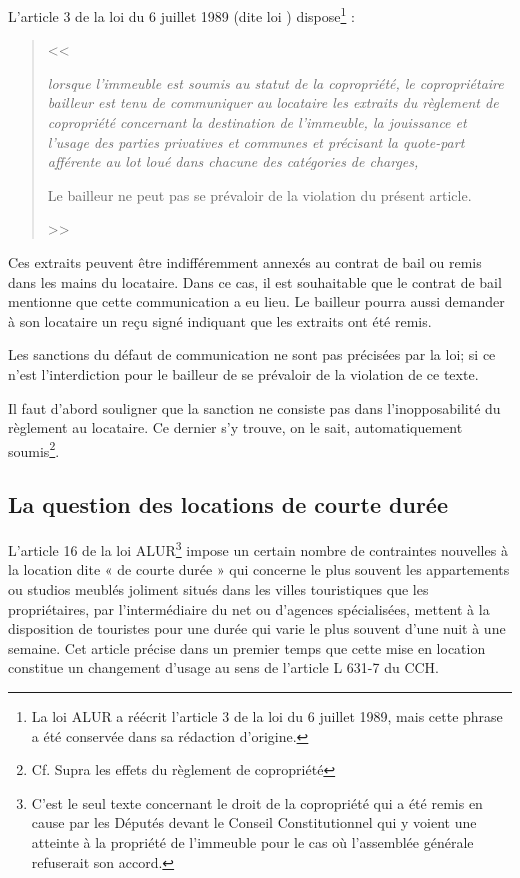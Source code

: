 		L'article 3 de la loi du 6 juillet 1989 (dite loi ) dispose\footnote{La loi ALUR a réécrit l’article 3 de la loi du 6 juillet 1989, mais cette phrase a été conservée dans sa rédaction d’origine.} :
		\begin{quote}
			<< {\itshape lorsque l'immeuble est soumis au statut de la copropriété, le copropriétaire bailleur est tenu de communiquer au locataire les extraits du règlement de copropriété concernant la destination de l'immeuble, la jouissance et l'usage des parties privatives et communes et précisant la quote-part afférente au lot loué dans chacune des catégories de charges,
			
			\lips
			
			Le bailleur ne peut pas se prévaloir de la violation du présent article. } >>
		\end{quote}
		Ces extraits peuvent être indifféremment annexés au contrat de bail ou remis dans les mains du locataire. Dans ce cas, il est souhaitable que le contrat de bail mentionne que cette communication a eu lieu. Le bailleur pourra aussi demander à son locataire un reçu signé indiquant que les extraits ont été remis.
		
		Les sanctions du défaut de communication ne sont pas précisées par la loi; si ce n'est l'interdiction pour le bailleur de se prévaloir de la violation de ce texte.
		
		Il faut d'abord souligner que la sanction ne consiste pas dans l'inopposabilité du règlement au locataire. Ce dernier s'y trouve, on le sait, automatiquement soumis\footnote{Cf. Supra les effets du règlement de copropriété}.
	
	\subsection{La question des locations de courte durée}
	
		L’article 16 de la loi ALUR\footnote{C’est le seul texte concernant le droit de la copropriété qui a été remis en cause par les Députés devant le Conseil Constitutionnel qui y voient une atteinte à la propriété de l’immeuble pour le cas où l’assemblée générale refuserait son accord.} impose un certain nombre de contraintes nouvelles à la location dite « de courte durée » qui concerne le plus souvent les appartements ou studios meublés joliment situés dans les villes touristiques que les propriétaires, par l’intermédiaire du net ou d’agences spécialisées, mettent à la disposition de touristes pour une durée qui varie le plus souvent d’une nuit à une semaine.
		Cet article précise dans un premier temps que cette mise en location constitue un changement d’usage au sens de l’article L 631-7 du CCH.
		

